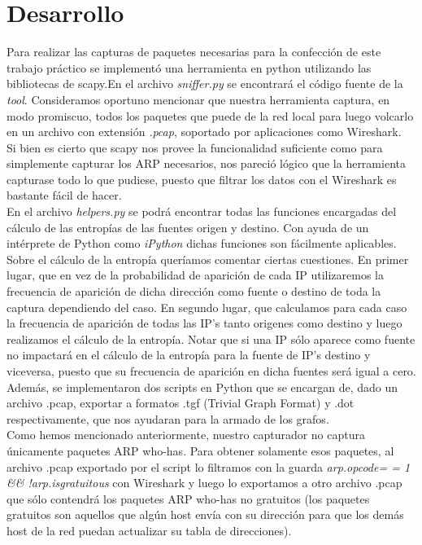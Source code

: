\section{Desarrollo}

\indent \indent Para realizar las capturas de paquetes necesarias para la confección de este trabajo práctico se implementó una herramienta en python utilizando las bibliotecas de scapy.En el archivo \textit{sniffer.py} se encontrará el código fuente de la \textit{tool}. Consideramos oportuno mencionar que nuestra herramienta captura, en modo promiscuo, todos los paquetes que puede de la red local para luego volcarlo en un archivo con extensión \textit{.pcap}, soportado por aplicaciones como Wireshark.\\
\indent Si bien es cierto que scapy nos provee la funcionalidad suficiente como para simplemente capturar los ARP necesarios, nos pareció lógico que la herramienta capturase todo lo que pudiese, puesto que filtrar los datos con el Wireshark es bastante fácil de hacer.\\
\indent En el archivo \textit{helpers.py} se podrá encontrar todas las funciones encargadas del cálculo de las entropías de las fuentes origen y destino. Con ayuda de un intérprete de Python como \textit{iPython} dichas funciones son fácilmente aplicables.\\
\indent Sobre el cálculo de la entropía queríamos comentar ciertas cuestiones. En primer lugar, que en vez de la probabilidad de aparición de cada IP utilizaremos la frecuencia de aparición de dicha dirección como fuente o destino de toda la captura dependiendo del caso. En segundo lugar, que calculamos para cada caso la frecuencia de aparición de todas las IP's tanto origenes como destino y luego realizamos el cálculo de la entropía. Notar que si una IP sólo aparece como fuente no impactará en el cálculo de la entropía para la fuente de IP's destino y viceversa, puesto que su frecuencia de aparición en dicha fuentes será igual a cero.\\
\indent Además, se implementaron dos scripts en Python que se encargan de, dado un archivo .pcap, exportar a formatos .tgf (Trivial Graph Format) y .dot respectivamente, que nos ayudaran para la armado de los grafos.\\
\indent Como hemos mencionado anteriormente, nuestro capturador no captura únicamente paquetes ARP who-has. Para obtener solamente esos paquetes, al archivo .pcap exportado por el script lo filtramos con la guarda \textit {arp.opcode= = 1 \&\&  !arp.isgratuitous} con Wireshark y luego lo exportamos a otro archivo .pcap que sólo contendrá los paquetes ARP who-has no gratuitos (los paquetes gratuitos son aquellos que algún host envía con su dirección para que los demás host de la red puedan actualizar su tabla de direcciones).\\ 
